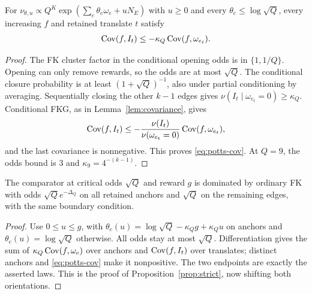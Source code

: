 \begin{lemma}\label{lem:potts-covariance}
For $\nu_{\theta,u}\propto Q^K\exp(\sum_e\theta_e\omega_e+uN_E)$ with $u\ge0$ and every $\theta_e\le\log\sqrt Q$, every increasing $f$ and retained translate $t$ satisfy
\begin{equation}\label{eq:potts-cov}
 \operatorname{Cov}(f,I_t)\le-\kappa_Q\operatorname{Cov}(f,\omega_{e_t}).
\end{equation}
\end{lemma}
\begin{proof}
The FK cluster factor in the conditional opening odds is in $\{1,1/Q\}$. Opening can only remove rewards, so the odds are at most $\sqrt Q$. The conditional closure probability is at least $(1+\sqrt Q)^{-1}$, also under partial conditioning by averaging. Sequentially closing the other $k-1$ edges gives
$\nu(I_t\mid\omega_{e_t}=0)\ge\kappa_Q$.
Conditional FKG, as in Lemma~\ref{lem:covariance}, gives
\[
 \operatorname{Cov}(f,I_t)\le
 -\frac{\nu(I_t)}{\nu(\omega_{e_t}=0)}\operatorname{Cov}(f,\omega_{e_t}),
\]
and the last covariance is nonnegative. This proves \eqref{eq:potts-cov}. At $Q=9$, the odds bound is $3$ and $\kappa_9=4^{-(k-1)}$.
\end{proof}

\begin{proposition}\label{prop:potts-strict}
The comparator at critical odds $\sqrt Q$ and reward $g$ is dominated by ordinary FK with odds $\sqrt Qe^{-\Delta_Q}$ on all retained anchors and $\sqrt Q$ on the remaining edges, with the same boundary condition.
\end{proposition}
\begin{proof}
Use $0\le u\le g$, with $\theta_e(u)=\log\sqrt Q-\kappa_Qg+\kappa_Qu$ on anchors and $\theta_e(u)=\log\sqrt Q$ otherwise. All odds stay at most $\sqrt Q$. Differentiation gives the sum of $\kappa_Q\operatorname{Cov}(f,\omega_e)$ over anchors and $\operatorname{Cov}(f,I_t)$ over translates; distinct anchors and \eqref{eq:potts-cov} make it nonpositive. The two endpoints are exactly the asserted laws. This is the proof of Proposition~\ref{prop:strict}, now shifting both orientations.
\end{proof}

